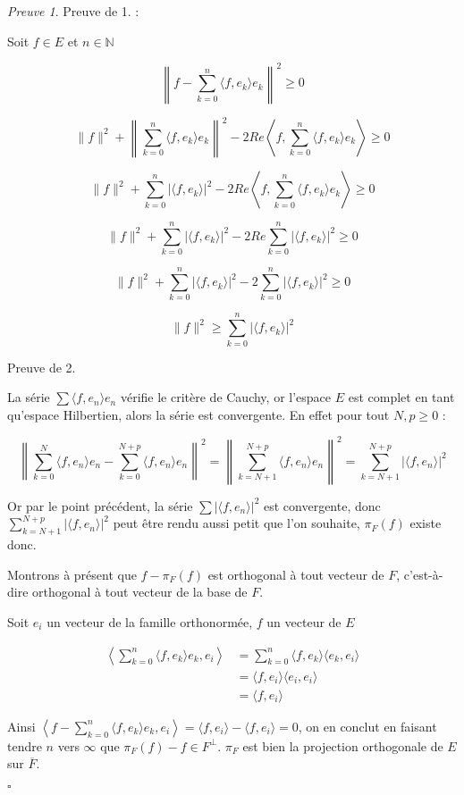 \documentclass[]{article}
\theoremstyle{remark}
\newtheorem{myproof}{Preuve}
\theoremstyle{definition}
\newcommand{\cqfd}{
	\hfill$\square$
}
\newcommand{\DS}{\displaystyle}
\begin{document}
	\begin{myproof}
		Preuve de 1. :
		
		Soit $f \in E$ et $n \in \mathbb{N}$
		
		$$\left\| f - \sum_{k = 0}^{n} \langle f, e_k \rangle e_k \right\|^2 \geqslant 0$$
		
		$$\|f\|^2 + \left\| \sum_{k = 0}^{n} \langle f, e_k\rangle e_k \right\|^2 - 2 Re \left \langle f , \sum_{k = 0}^{n} \langle f, e_k \rangle e_k \right\rangle \geqslant 0$$
		
		$$\|f\|^2 + \sum_{k = 0}^{n} | \langle f, e_k\rangle | ^2 - 2 Re \left \langle f , \sum_{k = 0}^{n} \langle f, e_k \rangle e_k \right\rangle \geqslant 0$$
		
		$$\|f\|^2 + \sum_{k = 0}^{n} | \langle f, e_k\rangle | ^2 - 2 Re \sum_{k = 0}^{n} |\langle f , e_k \rangle |^2 \geqslant 0$$
		
		$$\|f\|^2 + \sum_{k = 0}^{n} | \langle f, e_k\rangle | ^2 - 2 \sum_{k = 0}^{n} |\langle f , e_k \rangle |^2 \geqslant 0$$
		
		$$\|f\|^2 \geqslant \sum_{k = 0}^{n} |\langle f , e_k \rangle |^2$$
		
		Preuve de 2.
		
		La série $\DS \sum \langle f, e_n \rangle e_n$ vérifie le critère de Cauchy, or l'espace $E$ est complet en tant qu'espace Hilbertien, alors la série est convergente. En effet pour tout $N, p \geqslant 0$ :
		
		$$\left\|\sum_{k = 0}^{N} \langle f, e_n \rangle e_n - \sum_{k = 0}^{N + p} \langle f , e_n \rangle e_n\right\|^2 = \left\| \sum_{k = N+1}^{N + p} \langle f , e_n \rangle e_n \right\|^2 = \sum_{k = N+1}^{N + p} |\langle f , e_n \rangle|^2$$
		
		Or par le point précédent, la série $\DS \sum | \langle f, e_n \rangle|^2$ est convergente, donc  $\DS \sum_{k = N+1}^{N + p} |\langle f , e_n \rangle|^2$ peut être rendu aussi petit que l'on souhaite, $\pi_F(f)$ existe donc.
		
		Montrons à présent que $f - \pi_F(f)$ est orthogonal à tout vecteur de $F$, c'est-à-dire orthogonal à tout vecteur de la base de $F$.
		
		Soit $e_i$ un vecteur de la famille orthonormée, $f$ un vecteur de $E$
		
		$$
		\begin{aligned}
			\left \langle \sum_{k=0}^n \langle f, e_k \rangle e_k, e_i \right \rangle &= \sum_{k=0}^{n} \langle f, e_k \rangle \langle e_k, e_i \rangle \\
			&= \langle f, e_i \rangle \langle e_i, e_i \rangle \\
			&= \langle f, e_i \rangle
		\end{aligned}
		$$

		Ainsi $\DS \left\langle f - \sum_{k = 0}^n \langle f, e_k \rangle e_k, e_i \right \rangle = \langle f, e_i \rangle - \langle f, e_i \rangle = 0$, on en conclut en faisant tendre $n$ vers $\infty$ que $\pi_F(f) - f \in F^\bot$. $\pi_F$ est bien la projection orthogonale de $E$ sur $\overline{F}$.
		
		\cqfd
	\end{myproof}
	
\end{document}
